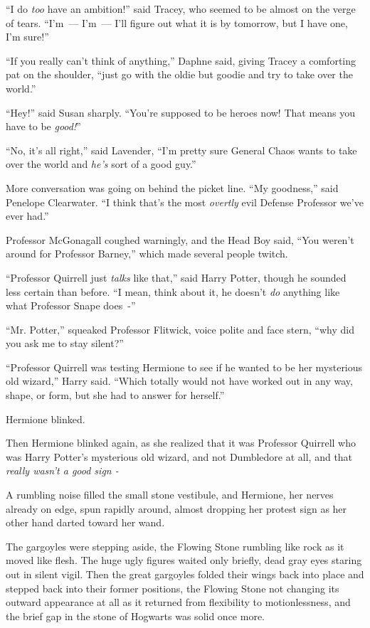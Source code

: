 ``I do \emph{too} have an ambition!'' said Tracey, who seemed to be almost on the verge of tears. ``I'm~--- I'm~--- I'll figure out what it is by tomorrow, but I have one, I'm sure!''

``If you really can't think of anything,'' Daphne said, giving Tracey a comforting pat on the shoulder, ``just go with the oldie but goodie and try to take over the world.''

``Hey!'' said Susan sharply. ``You're supposed to be heroes now! That means you have to be \emph{good!}''

``No, it's all right,'' said Lavender, ``I'm pretty sure General Chaos wants to take over the world and \emph{he's} sort of a good guy.''

More conversation was going on behind the picket line. ``My goodness,'' said Penelope Clearwater. ``I think that's the most \emph{overtly} evil Defense Professor we've ever had.''

Professor McGonagall coughed warningly, and the Head Boy said, ``You weren't around for Professor Barney,'' which made several people twitch.

``Professor Quirrell just \emph{talks} like that,'' said Harry Potter, though he sounded less certain than before. ``I mean, think about it, he doesn't \emph{do} anything like what Professor Snape does~-''

``Mr. Potter,'' squeaked Professor Flitwick, voice polite and face stern, ``why did you ask me to stay silent?''

``Professor Quirrell was testing Hermione to see if he wanted to be her mysterious old wizard,'' Harry said. ``Which totally would not have worked out in any way, shape, or form, but she had to answer for herself.''

Hermione blinked.

Then Hermione blinked again, as she realized that it was Professor Quirrell who was Harry Potter's mysterious old wizard, and not Dumbledore at all, and that \emph{really wasn't a good sign -}

A rumbling noise filled the small stone vestibule, and Hermione, her nerves already on edge, spun rapidly around, almost dropping her protest sign as her other hand darted toward her wand.

The gargoyles were stepping aside, the Flowing Stone rumbling like rock as it moved like flesh. The huge ugly figures waited only briefly, dead gray eyes staring out in silent vigil. Then the great gargoyles folded their wings back into place and stepped back into their former positions, the Flowing Stone not changing its outward appearance at all as it returned from flexibility to motionlessness, and the brief gap in the stone of Hogwarts was solid once more.

